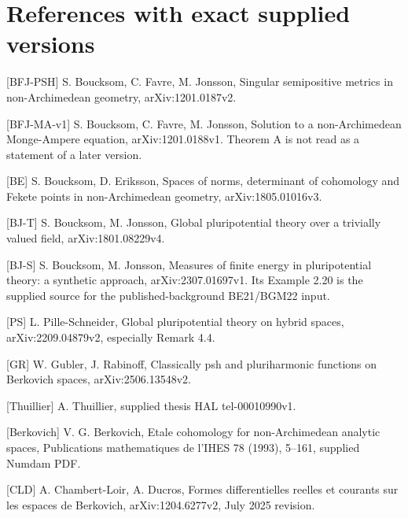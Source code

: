 \documentclass[11pt]{article}
\begin{document}
\section*{References with exact supplied versions}

[BFJ-PSH] S. Boucksom, C. Favre, M. Jonsson, Singular semipositive metrics in non-Archimedean geometry, arXiv:1201.0187v2.

[BFJ-MA-v1] S. Boucksom, C. Favre, M. Jonsson, Solution to a non-Archimedean Monge-Ampere equation, arXiv:1201.0188v1. Theorem A is not read as a statement of a later version.

[BE] S. Boucksom, D. Eriksson, Spaces of norms, determinant of cohomology and Fekete points in non-Archimedean geometry, arXiv:1805.01016v3.

[BJ-T] S. Boucksom, M. Jonsson, Global pluripotential theory over a trivially valued field, arXiv:1801.08229v4.

[BJ-S] S. Boucksom, M. Jonsson, Measures of finite energy in pluripotential theory: a synthetic approach, arXiv:2307.01697v1. Its Example 2.20 is the supplied source for the published-background BE21/BGM22 input.

[PS] L. Pille-Schneider, Global pluripotential theory on hybrid spaces, arXiv:2209.04879v2, especially Remark 4.4.

[GR] W. Gubler, J. Rabinoff, Classically psh and pluriharmonic functions on Berkovich spaces, arXiv:2506.13548v2.

[Thuillier] A. Thuillier, supplied thesis HAL tel-00010990v1.

[Berkovich] V. G. Berkovich, Etale cohomology for non-Archimedean analytic spaces, Publications mathematiques de l'IHES 78 (1993), 5--161, supplied Numdam PDF.

[CLD] A. Chambert-Loir, A. Ducros, Formes differentielles reelles et courants sur les espaces de Berkovich, arXiv:1204.6277v2, July 2025 revision.
\end{document}
